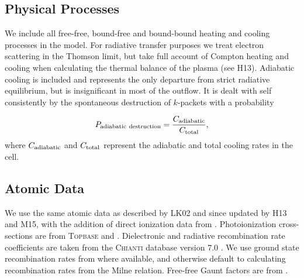 \documentclass[preprint, a4paper, 11pt]{aastex}
\begin{document}
\subsection{Physical Processes}

We include all free-free, bound-free and bound-bound heating
and cooling processes in the model. For radiative transfer purposes
we treat electron scattering in the Thomson limit, 
but take full account of Compton heating and cooling when
calculating the thermal balance of the plasma (see H13).
Adiabatic cooling is included and represents the only
departure from strict radiative equilibrium, but is insignificant 
in most of the outflow.
It is dealt with self consistently by the spontaneous destruction
of $k$-packets with a probability

\begin{equation}
P_{\rm{adiabatic~destruction}} = \frac{C_{\rm{adiabatic}}}{C_{\rm{total}}},
\end{equation}
where $C_{\rm{adiabatic}}$ and ${C_{\rm{total}}}$ represent the 
adiabatic and total cooling rates in the cell.


\subsection{Atomic Data}

We use the same atomic data as described by LK02 and since updated by H13 and M15, 
with the addition of direct ionization data from \cite{dere2007}. 
Photoionization cross-sections are from \textsc{Topbase} \citep{cunto1993} and  \cite{vfky}.
Dielectronic and radiative recombination rate coefficients are taken from 
the \textsc{Chianti} database version 7.0 \citep{dere1997,landi2012}.
We use ground state recombination rates from \cite{badnell2006} where available,
and otherwise default to calculating recombination rates from the Milne
relation. Free-free Gaunt factors are from \cite{sutherland1998}.
\end{document}
